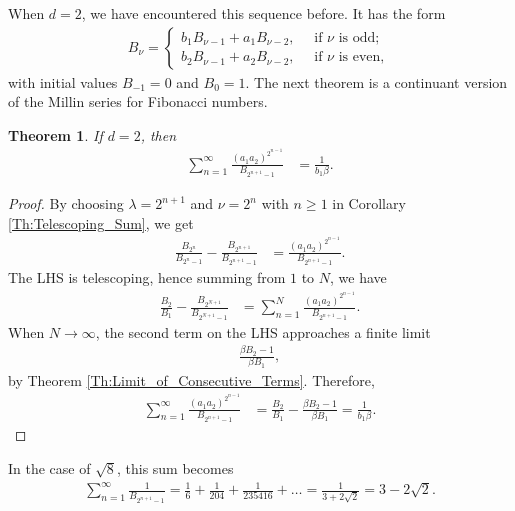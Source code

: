 \documentclass[12pt]{article}
\theoremstyle{plain}
\newtheorem{theorem}{Theorem}
\theoremstyle{definition}
\theoremstyle{remark}
\begin{document}
When $ d = 2 $, we have encountered this sequence before. It has the form
\begin{align*}
	B_\nu = \begin{cases} b_1 B_{\nu - 1} + a_1 B_{\nu - 2}, \quad \text{ if } \nu \text{ is odd}; \\ b_2 B_{\nu - 1} + a_2 B_{\nu - 2}, \quad \text{ if } \nu \text{ is even}, \end{cases}
\end{align*}
with initial values $ B_{-1} = 0 $ and $ B_0 = 1 $. The next theorem is a continuant version of the Millin series \cite{Millin_74} for Fibonacci numbers.

\begin{theorem} If $ d = 2 $, then
\begin{align*}
	\sum_{n = 1}^\infty \frac{(a_1 a_2)^{2^{n - 1}}}{B_{2^{n + 1} - 1}} &= \frac{1}{b_1 \beta}.
\end{align*}
\end{theorem}

\begin{proof} By choosing $ \lambda = 2^{n + 1} $ and $ \nu = 2^n $ with $ n \geq 1 $ in Corollary \ref{Th:Telescoping_Sum}, we get
\begin{align*}
	\frac{B_{2^n}}{B_{2^n - 1}} - \frac{B_{2^{n + 1}}}{B_{2^{n + 1} - 1}} &= \frac{(a_1 a_2)^{2^{n - 1}}}{B_{2^{n + 1} - 1}}.
\end{align*}
The LHS is telescoping, hence summing from $ 1 $ to $ N $, we have
\begin{align*}
	\frac{B_2}{B_1} - \frac{B_{2^{N + 1}}}{B_{2^{N + 1} - 1}} &= \sum_{n = 1}^N \frac{(a_1 a_2)^{2^{n - 1}}}{B_{2^{n + 1} - 1}}.
\end{align*}
When $ N \longrightarrow \infty $, the second term on the LHS approaches a finite limit
\begin{align*}
	\frac{\beta B_2 - 1}{\beta B_1},
\end{align*}
by Theorem \ref{Th:Limit_of_Consecutive_Terms}. Therefore,
\begin{align*}
	\sum_{n = 1}^\infty \frac{(a_1 a_2)^{2^{n - 1}}}{B_{2^{n + 1} - 1}} &= \frac{B_2}{B_1} - \frac{\beta B_2 - 1}{\beta B_1} = \frac{1}{b_1 \beta}.
\end{align*}
\end{proof}

In the case of $ \sqrt{8} $, this sum becomes
\begin{align*}
	\sum_{n = 1}^\infty \frac{1}{B_{2^{n + 1} - 1}} = \frac{1}{6} + \frac{1}{204} + \frac{1}{235416} + \ldots = \frac{1}{3 + 2\sqrt{2}} = 3 - 2\sqrt{2}.
\end{align*}
\end{document}
